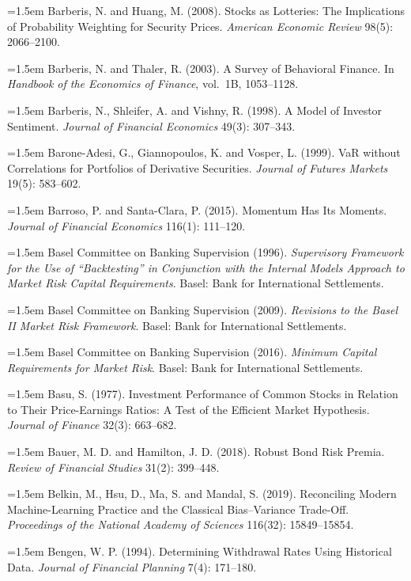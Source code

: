 \hangindent=1.5em Barberis, N. and Huang, M. (2008). Stocks as Lotteries: The Implications of Probability Weighting for Security Prices. \emph{American Economic Review} 98(5): 2066--2100.

\hangindent=1.5em Barberis, N. and Thaler, R. (2003). A Survey of Behavioral Finance. In \emph{Handbook of the Economics of Finance}, vol.\ 1B, 1053--1128.

\hangindent=1.5em Barberis, N., Shleifer, A. and Vishny, R. (1998). A Model of Investor Sentiment. \emph{Journal of Financial Economics} 49(3): 307--343.

\hangindent=1.5em Barone-Adesi, G., Giannopoulos, K. and Vosper, L. (1999). VaR without Correlations for Portfolios of Derivative Securities. \emph{Journal of Futures Markets} 19(5): 583--602.

\hangindent=1.5em Barroso, P. and Santa-Clara, P. (2015). Momentum Has Its Moments. \emph{Journal of Financial Economics} 116(1): 111--120.

\hangindent=1.5em Basel Committee on Banking Supervision (1996). \emph{Supervisory Framework for the Use of ``Backtesting'' in Conjunction with the Internal Models Approach to Market Risk Capital Requirements}. Basel: Bank for International Settlements.

\hangindent=1.5em Basel Committee on Banking Supervision (2009). \emph{Revisions to the Basel II Market Risk Framework}. Basel: Bank for International Settlements.

\hangindent=1.5em Basel Committee on Banking Supervision (2016). \emph{Minimum Capital Requirements for Market Risk}. Basel: Bank for International Settlements.

\hangindent=1.5em Basu, S. (1977). Investment Performance of Common Stocks in Relation to Their Price-Earnings Ratios: A Test of the Efficient Market Hypothesis. \emph{Journal of Finance} 32(3): 663--682.

\hangindent=1.5em Bauer, M. D. and Hamilton, J. D. (2018). Robust Bond Risk Premia. \emph{Review of Financial Studies} 31(2): 399--448.

\hangindent=1.5em Belkin, M., Hsu, D., Ma, S. and Mandal, S. (2019). Reconciling Modern Machine-Learning Practice and the Classical Bias--Variance Trade-Off. \emph{Proceedings of the National Academy of Sciences} 116(32): 15849--15854.

\hangindent=1.5em Bengen, W. P. (1994). Determining Withdrawal Rates Using Historical Data. \emph{Journal of Financial Planning} 7(4): 171--180.

